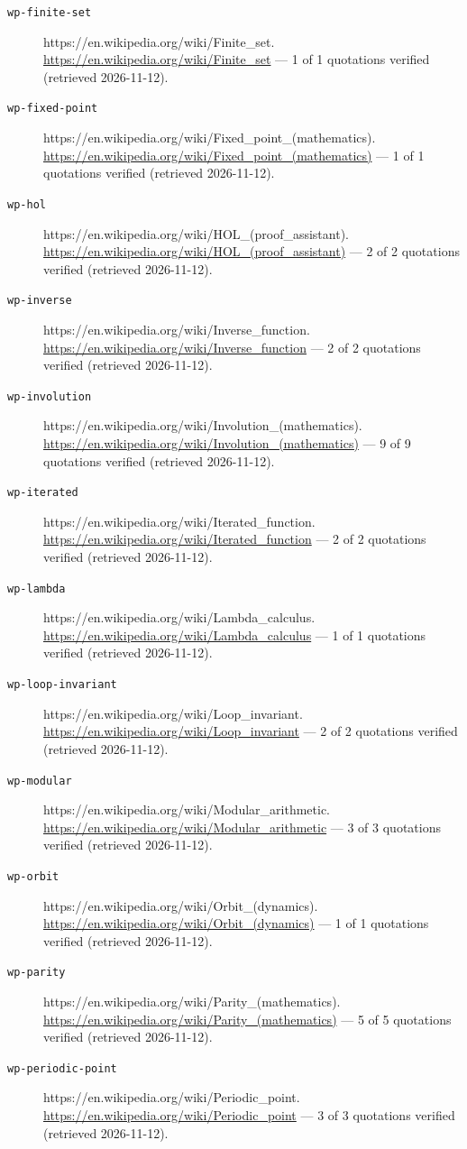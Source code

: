\documentclass[11pt,letterpaper,openright]{book}
\theoremstyle{plain}
\theoremstyle{definition}
\theoremstyle{remark}
\begin{document}
\begin{description}
\item[\texttt{wp-finite-set}] https://en.wikipedia.org/wiki/Finite\_set. \url{https://en.wikipedia.org/wiki/Finite_set} --- 1 of 1 quotations verified (retrieved 2026-11-12).
\item[\texttt{wp-fixed-point}] https://en.wikipedia.org/wiki/Fixed\_point\_(mathematics). \url{https://en.wikipedia.org/wiki/Fixed_point_(mathematics)} --- 1 of 1 quotations verified (retrieved 2026-11-12).
\item[\texttt{wp-hol}] https://en.wikipedia.org/wiki/HOL\_(proof\_assistant). \url{https://en.wikipedia.org/wiki/HOL_(proof_assistant)} --- 2 of 2 quotations verified (retrieved 2026-11-12).
\item[\texttt{wp-inverse}] https://en.wikipedia.org/wiki/Inverse\_function. \url{https://en.wikipedia.org/wiki/Inverse_function} --- 2 of 2 quotations verified (retrieved 2026-11-12).
\item[\texttt{wp-involution}] https://en.wikipedia.org/wiki/Involution\_(mathematics). \url{https://en.wikipedia.org/wiki/Involution_(mathematics)} --- 9 of 9 quotations verified (retrieved 2026-11-12).
\item[\texttt{wp-iterated}] https://en.wikipedia.org/wiki/Iterated\_function. \url{https://en.wikipedia.org/wiki/Iterated_function} --- 2 of 2 quotations verified (retrieved 2026-11-12).
\item[\texttt{wp-lambda}] https://en.wikipedia.org/wiki/Lambda\_calculus. \url{https://en.wikipedia.org/wiki/Lambda_calculus} --- 1 of 1 quotations verified (retrieved 2026-11-12).
\item[\texttt{wp-loop-invariant}] https://en.wikipedia.org/wiki/Loop\_invariant. \url{https://en.wikipedia.org/wiki/Loop_invariant} --- 2 of 2 quotations verified (retrieved 2026-11-12).
\item[\texttt{wp-modular}] https://en.wikipedia.org/wiki/Modular\_arithmetic. \url{https://en.wikipedia.org/wiki/Modular_arithmetic} --- 3 of 3 quotations verified (retrieved 2026-11-12).
\item[\texttt{wp-orbit}] https://en.wikipedia.org/wiki/Orbit\_(dynamics). \url{https://en.wikipedia.org/wiki/Orbit_(dynamics)} --- 1 of 1 quotations verified (retrieved 2026-11-12).
\item[\texttt{wp-parity}] https://en.wikipedia.org/wiki/Parity\_(mathematics). \url{https://en.wikipedia.org/wiki/Parity_(mathematics)} --- 5 of 5 quotations verified (retrieved 2026-11-12).
\item[\texttt{wp-periodic-point}] https://en.wikipedia.org/wiki/Periodic\_point. \url{https://en.wikipedia.org/wiki/Periodic_point} --- 3 of 3 quotations verified (retrieved 2026-11-12).

\end{description}
\end{document}

